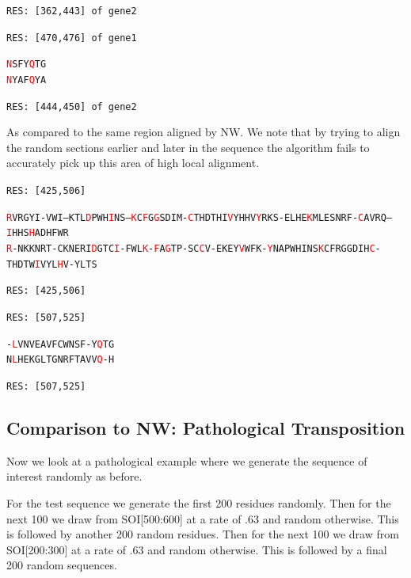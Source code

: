 \documentclass[phd,tocprelim]{cornell}
\begin{document}
\begin{flushleft}
\texttt{RES: [362,443] of gene2}

\texttt{RES: [470,476] of gene1}

\texttt{\textcolor{red}{N}SFY\textcolor{red}{Q}TG} \\
\texttt{\textcolor{red}{N}YAF\textcolor{red}{Q}YA}

\texttt{RES: [444,450] of gene2}

\normalsize
\normalspacing
\end{flushleft}

As compared to the same region aligned by NW. We note that by trying to align the random sections earlier and later in the sequence the algorithm fails to accurately pick up this area of high local alignment.

\begin{flushleft}
    \singlespacing
\footnotesize 
\texttt{RES: [425,506]}

\texttt{\textcolor{red}{R}VRGYI-VWI--KTL\textcolor{red}{D}PWH\textcolor{red}{I}NS--\textcolor{red}{K}C\textcolor{red}{F}G\textcolor{red}{G}SDIM-\textcolor{red}{C}THDTHI\textcolor{red}{V}YHHV\textcolor{red}{Y}RKS-ELHE\textcolor{red}{K}MLESNRF-\textcolor{red}{C}AVRQ--\textcolor{red}{I}HHS\textcolor{red}{H}ADHFWR} \\
\texttt{\textcolor{red}{R}-NKKNRT-CKNERI\textcolor{red}{D}GTC\textcolor{red}{I}-FWL\textcolor{red}{K}-\textcolor{red}{F}A\textcolor{red}{G}TP-SC\textcolor{red}{C}V-EKEY\textcolor{red}{V}WFK-\textcolor{red}{Y}NAPWHINS\textcolor{red}{K}CFRGGDIH\textcolor{red}{C}-THDTW\textcolor{red}{I}VYL\textcolor{red}{H}V-YLTS}

\texttt{RES: [425,506]}

\texttt{RES: [507,525]}

\texttt{-\textcolor{red}{L}VNVEAVFCWNSF-Y\textcolor{red}{Q}TG} \\
\texttt{N\textcolor{red}{L}HEKGLTGNRFTAVV\textcolor{red}{Q}-H}

\texttt{RES: [507,525]}

\normalsize
\normalspacing
\end{flushleft}

\subsection{Comparison to NW: Pathological Transposition}

Now we look at a pathological example where we generate the sequence of interest randomly as before.

For the test sequence we generate the first 200 residues randomly. Then for the next 100 we draw from SOI[500:600] at a rate of .63 and random otherwise. This is followed by another 200 random residues. Then for the next 100 we draw from SOI[200:300] at a rate of .63 and random otherwise. This is followed by a final 200 random sequences.
\end{document}
